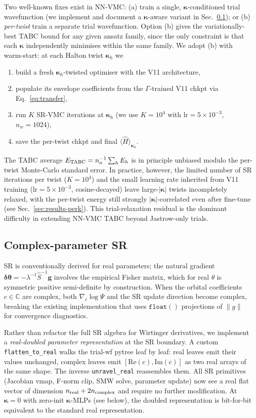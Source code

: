 \documentclass[reprint,amsmath,amssymb,aps,prb,floatfix,nofootinbib]{revtex4-2}
\begin{document}
Two well-known fixes exist in NN-VMC: (a) train a single,
$\bm\kappa$-conditioned trial wavefunction (we implement and document
a $\bm\kappa$-aware variant in Sec.~\ref{sec:complex-sr}); or (b)
\emph{per-twist} train a separate trial wavefunction.  Option (b)
gives the variationally-best TABC bound for any given ansatz family,
since the only constraint is that each $\bm\kappa$ independently
minimises within the same family.  We adopt (b) with warm-start: at
each Halton twist $\bm\kappa_h$ we
\begin{enumerate}
\item build a fresh $\bm\kappa_h$-twisted optimiser with the V11
      architecture,
\item populate its envelope coefficients from the $\Gamma$-trained
      V11 chkpt via Eq.~\eqref{eq:transfer},
\item run $K$ SR-VMC iterations at $\bm\kappa_h$ (we use $K=10^4$
      with $\mathrm{lr} = 5\times10^{-3}$, $n_w = 1024$),
\item save the per-twist chkpt and final $\langle\hat
      H\rangle_{\bm\kappa_h}$.
\end{enumerate}
The TABC average $E_{\rm TABC} = n_\kappa^{-1}\sum_h E_h$ is in
principle unbiased modulo the per-twist Monte-Carlo standard error.
In practice, however, the limited number of SR iterations per twist
($K=10^4$) and the small learning rate inherited from V11 training
($\mathrm{lr} = 5\times10^{-3}$, cosine-decayed) leave large-$|\bm\kappa|$
twists incompletely relaxed, with the per-twist energy still strongly
$|\bm\kappa|$-correlated even after fine-tune (see
Sec.~\ref{sec:results-perk}).  This trial-relaxation residual is the
dominant difficulty in extending NN-VMC TABC beyond Jastrow-only
trials.

\subsection{Complex-parameter SR}\label{sec:complex-sr}
SR is conventionally derived for real parameters; the natural
gradient
$\bm{\delta\theta} = -\lambda^{-1}\hat S^{-1}\mathbf{g}$ involves
the empirical Fisher matrix, which for real $\theta$ is symmetric
positive semi-definite by construction.  When the orbital
coefficients $c \in \mathbb{C}$ are complex, both
$\nabla_c \log\Psi$ and the SR update direction become complex,
breaking the existing implementation that uses
$\mathtt{float()}$ projections of $\|g\|$ for convergence
diagnostics.

Rather than refactor the full SR algebra for Wirtinger derivatives,
we implement a \emph{real-doubled parameter representation} at the
SR boundary.  A custom \texttt{flatten\_to\_real} walks the
trial-wf pytree leaf by leaf: real leaves emit their values
unchanged, complex leaves emit
$[\mathrm{Re}(c), \mathrm{Im}(c)]$ as two real arrays of the same
shape.  The inverse \texttt{unravel\_real} reassembles them.  All
SR primitives (Jacobian vmap, F-norm clip, SMW solve, parameter
update) now see a real flat vector of dimension
$n_{\rm real} + 2 n_{\rm complex}$ and require no further
modification.  At $\bm\kappa = 0$ with zero-init $\bm\kappa$-MLPs
(see below), the doubled representation is bit-for-bit equivalent
to the standard real representation.
\end{document}
